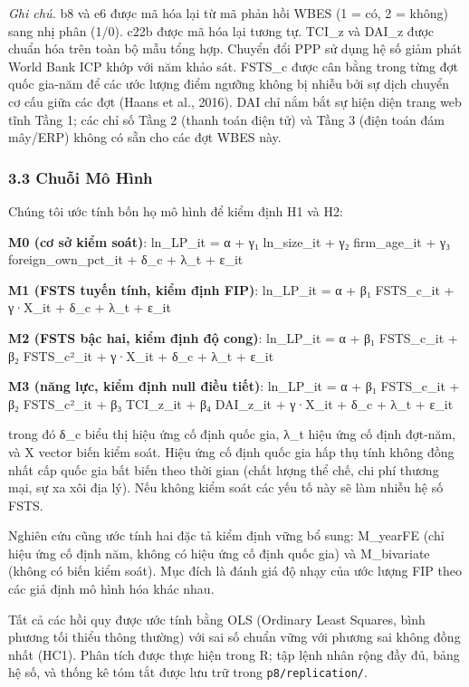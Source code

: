 \documentclass[12pt,a4paper]{article}
\begin{document}
\emph{Ghi chú.} b8 và e6 được mã hóa lại từ mã phản hồi WBES (1 = có, 2
= không) sang nhị phân (1/0). c22b được mã hóa lại tương tự. TCI\_z và
DAI\_z được chuẩn hóa trên toàn bộ mẫu tổng hợp. Chuyển đổi PPP sử dụng
hệ số giảm phát World Bank ICP khớp với năm khảo sát. FSTS\_c được cân
bằng trong từng đợt quốc gia-năm để các ước lượng điểm ngưỡng không bị
nhiễu bởi sự dịch chuyển cơ cấu giữa các đợt (Haans et al., 2016). DAI
chỉ nắm bắt sự hiện diện trang web tĩnh Tầng 1; các chỉ số Tầng 2 (thanh
toán điện tử) và Tầng 3 (điện toán đám mây/ERP) không có sẵn cho các đợt
WBES này.

\hypertarget{33-chuux1ed7i-muxf4-huxecnh}{%
\subsubsection{3.3 Chuỗi Mô Hình}\label{33-chuux1ed7i-muxf4-huxecnh}}

Chúng tôi ước tính bốn họ mô hình để kiểm định H1 và H2:

\textbf{M0 (cơ sở kiểm soát)}: ln\_LP\_it = α + γ₁ ln\_size\_it + γ₂
firm\_age\_it + γ₃ foreign\_own\_pct\_it + δ\_c + λ\_t + ε\_it

\textbf{M1 (FSTS tuyến tính, kiểm định FIP)}: ln\_LP\_it = α + β₁
FSTS\_c\_it + γ·X\_it + δ\_c + λ\_t + ε\_it

\textbf{M2 (FSTS bậc hai, kiểm định độ cong)}: ln\_LP\_it = α + β₁
FSTS\_c\_it + β₂ FSTS\_c²\_it + γ·X\_it + δ\_c + λ\_t + ε\_it

\textbf{M3 (năng lực, kiểm định null điều tiết)}: ln\_LP\_it = α + β₁
FSTS\_c\_it + β₂ FSTS\_c²\_it + β₃ TCI\_z\_it + β₄ DAI\_z\_it + γ·X\_it
+ δ\_c + λ\_t + ε\_it

trong đó δ\_c biểu thị hiệu ứng cố định quốc gia, λ\_t hiệu ứng cố định
đợt-năm, và X vector biến kiểm soát. Hiệu ứng cố định quốc gia hấp thụ
tính không đồng nhất cấp quốc gia bất biến theo thời gian (chất lượng
thể chế, chi phí thương mại, sự xa xôi địa lý). Nếu không kiểm soát các
yếu tố này sẽ làm nhiễu hệ số FSTS.

Nghiên cứu cũng ước tính hai đặc tả kiểm định vững bổ sung: M\_yearFE
(chỉ hiệu ứng cố định năm, không có hiệu ứng cố định quốc gia) và
M\_bivariate (không có biến kiểm soát). Mục đích là đánh giá độ nhạy của
ước lượng FIP theo các giả định mô hình hóa khác nhau.

Tất cả các hồi quy được ước tính bằng OLS (Ordinary Least Squares, bình
phương tối thiểu thông thường) với sai số chuẩn vững với phương sai
không đồng nhất (HC1). Phân tích được thực hiện trong R; tập lệnh nhân
rộng đầy đủ, bảng hệ số, và thống kê tóm tắt được lưu trữ trong
\texttt{p8/replication/}.
\end{document}
